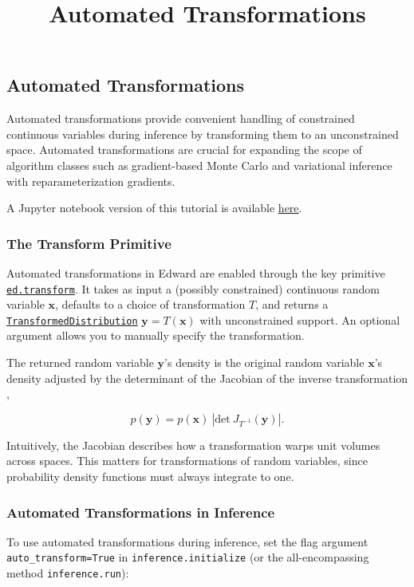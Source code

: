 \title{Automated Transformations}

\subsection{Automated Transformations}

Automated transformations provide convenient handling of constrained
continuous variables during inference by transforming them to an
unconstrained space. Automated transformations are crucial for
expanding the scope of algorithm classes such as gradient-based Monte
Carlo and variational inference with reparameterization gradients.

A Jupyter notebook version of this tutorial is available
\href{http://nbviewer.jupyter.org/github/blei-lab/edward/blob/master/notebooks/automated_transformations.ipynb}{here}.

\subsubsection{The Transform Primitive}

Automated transformations in Edward are enabled through the key
primitive
\href{/api/ed/transform}{\texttt{ed.transform}}.
It takes as input a (possibly constrained) continuous random variable
$\mathbf{x}$, defaults to a choice of transformation $T$, and returns a
\href{/api/ed/models/TransformedDistribution}
{\texttt{TransformedDistribution}}
$\mathbf{y}=T(\mathbf{x})$ with unconstrained support.
An optional argument allows you to manually specify the transformation.

The returned random variable $\mathbf{y}$'s density is the original
random variable $\mathbf{x}$'s density adjusted by the determinant of
the Jacobian of the inverse transformation \citep{casella2002statistical},

$$p(\mathbf{y}) = p(\mathbf{x})~|\mathrm{det}~J_{T^{-1}}(\mathbf{y}) |.$$

Intuitively, the Jacobian describes how a transformation warps unit
volumes across spaces. This matters for transformations of random
variables, since probability density functions must always integrate
to one.

\subsubsection{Automated Transformations in Inference}

To use automated transformations during inference, set the flag
argument \texttt{auto\_transform=True} in \texttt{inference.initialize}
(or the all-encompassing method \texttt{inference.run}):

